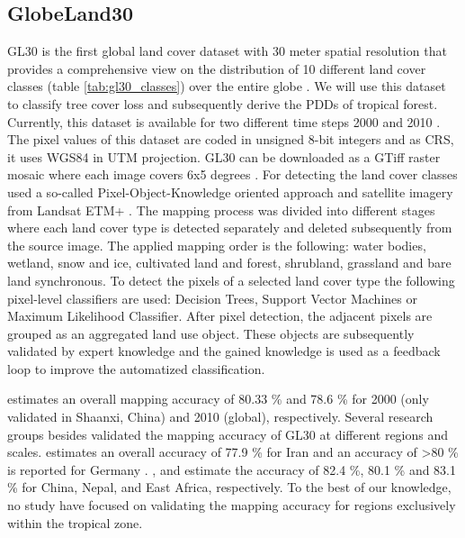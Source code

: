 	\subsection{GlobeLand30}
		\ac{GL30} is the first global land cover dataset with 30 meter spatial resolution that provides a comprehensive view on the distribution of 10 different land cover classes (table \ref{tab:gl30_classes}) over the entire globe \citep{Chen2017}. We will use this dataset to classify tree cover loss and subsequently derive the \acp{PDD} of tropical forest. Currently, this dataset is available for two different time steps 2000 and 2010 \citep{Chen2015}. The pixel values of this dataset are coded in unsigned 8-bit integers and as \ac{CRS}, it uses \ac{WGS84} in \ac{UTM} projection. \ac{GL30} can be downloaded as a \ac{GTiff} raster mosaic where each image covers 6x5 degrees \citep{Chen2014}. For detecting the land cover classes \citet{Chen2015} used a so-called Pixel-Object-Knowledge oriented approach and satellite imagery from Landsat ETM+ \citep{Chen2015}. The mapping process was divided into different stages where each land cover type is detected separately and deleted subsequently from the source image. The applied mapping order is the following: water bodies, wetland, snow and ice, cultivated land and forest, shrubland, grassland and bare land synchronous. To detect the pixels of a selected land cover type the following pixel-level classifiers are used: Decision Trees, Support Vector Machines or Maximum Likelihood Classifier. After pixel detection, the adjacent pixels are grouped as an aggregated land use object. These objects are subsequently validated by expert knowledge and the gained knowledge is used as a feedback loop to improve the automatized classification.

		\citet{Chen2015} estimates an overall mapping accuracy of 80.33 \% and 78.6 \% for 2000 (only validated in Shaanxi, China) and 2010 (global), respectively. Several research groups besides \citet{Chen2015} validated the mapping accuracy of \ac{GL30} at different regions and scales. \citet{Arsanjani2016} estimates an overall accuracy of 77.9 \% for Iran and an accuracy of >80 \% is reported for Germany \citep{Arsanjani2016a,Arsanjani2016}. \citet{Yang2017}, \citet{Cao2016} and \citet{Jacobson2015} estimate the accuracy of 82.4 \%, 80.1 \% and 83.1 \% for China, Nepal, and East Africa, respectively. To the best of our knowledge, no study have focused on validating the mapping accuracy for regions exclusively within the tropical zone.

